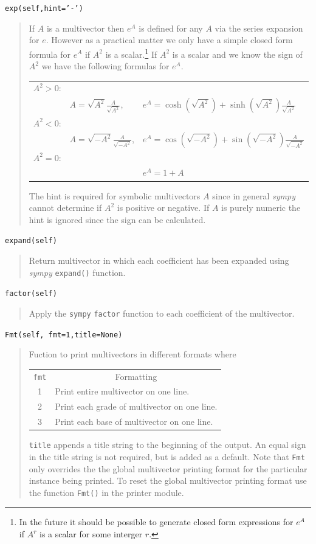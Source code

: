 \documentclass[12pt]{report}
\newcommand{\bfrac}[2]{\displaystyle\frac{#1}{#2}}
\newcommand{\lp}{\left (}
\newcommand{\rp}{\right )}
\newcommand{\f}[2]{{#1}\lp {#2} \rp}
\newcommand{\T}[1]{\texttt{#1}}
\begin{document}
\T{exp(self,hint='-')}
\begin{quote}
	If $A$ is a multivector then $e^{A}$ is defined for any $A$ via the series expansion for $e$.  However as
	a practical matter we only have a simple closed form formula for $e^{A}$ if $A^{2}$ is a scalar.\footnote{In the
	future it should be possible to generate closed form expressions for $e^{A}$ if $A^{r}$ is a scalar for some 
	interger $r$.} If $A^{2}$ is a scalar and we know the sign of $A^{2}$ we have the following formulas for $e^{A}$.
	\begin{center}
	\begin{tabular}{lll}
		$A^{2} > 0$: & & \\
		& $A = \sqrt{A^{2}} \bfrac{A}{\sqrt{A^{2}}}$, & $e^{A} = \f{\cosh}{\sqrt{A^{2}}}+\f{\sinh}{\sqrt{A^{2}}}\bfrac{A}{\sqrt{A^{2}}}$ \\
		$A^{2} < 0$: & & \\
		& $A = \sqrt{-A^{2}} \bfrac{A}{\sqrt{-A^{2}}}$, & $e^{A} = \f{\cos}{\sqrt{-A^{2}}}+\f{\sin}{\sqrt{-A^{2}}}\bfrac{A}{\sqrt{-A^{2}}}$ \\
		$A^{2} = 0$: & & \\
		& & $e^{A} = 1 + A$
	\end{tabular}	
	\end{center}
    The hint is required for symbolic multivectors $A$ since in general \emph{sympy} cannot determine if
    $A^{2}$ is positive or negative.  If $A$ is purely numeric the hint is ignored since the sign can be calculated.
\end{quote}

\T{expand(self)}
\begin{quote}
   Return multivector in which each coefficient has been expanded using
   \emph{sympy} \T{expand()} function.
\end{quote}

\T{factor(self)}
\begin{quote}
   Apply the \T{sympy} \T{factor} function to each coefficient of the multivector.
\end{quote}

\T{Fmt(self, fmt=1,title=None)}
\begin{quote}
    Fuction to print multivectors in different formats where
    \begin{center}
    \begin{tabular}{cl}
    \T{fmt} & \multicolumn{1}{c}{Formatting} \\
    1 & Print entire multivector on one line. \\
    2 & Print each grade of multivector on one line.\\
    3 & Print each base of multivector on one line.
    \end{tabular}
    \end{center}
    \T{title} appends a title string to the beginning of the output.  An equal sign in
    the title string is not required, but is added as a default.
    Note that \T{Fmt} only overrides the the global multivector printing format for the
    particular instance being printed.  To reset the global multivector printing format
    use the function \T{Fmt()} in the printer module.
\end{quote}
\end{document}
